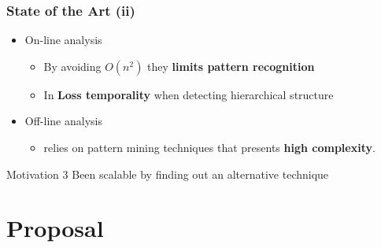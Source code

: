 \documentclass{beamer}
\begin{document}
\begin{frame}
\frametitle{State of the Art (ii)}
\begin{itemize}
	\item On-line analysis
	\begin{itemize}
		\item \cite{noeth2009scalatrace} By avoiding $O(n^{2})$ they \textbf{limits pattern recognition}
		\item In \cite{aguilar2016event} \textbf{Loss temporality} when detecting hierarchical structure
	\end{itemize}
	\item Off-line analysis
	\begin{itemize}
		\item \cite{Safyallah2006} \cite{Lopez-Cueva2012} \cite{trahay2015selecting} relies on pattern mining techniques that presents \textbf{high complexity}.
	\end{itemize}
\end{itemize}
\pause
\begin{block}{Motivation 3}
	Been scalable by finding out an alternative technique
\end{block}
\end{frame}

\section{Proposal}
\end{document}

